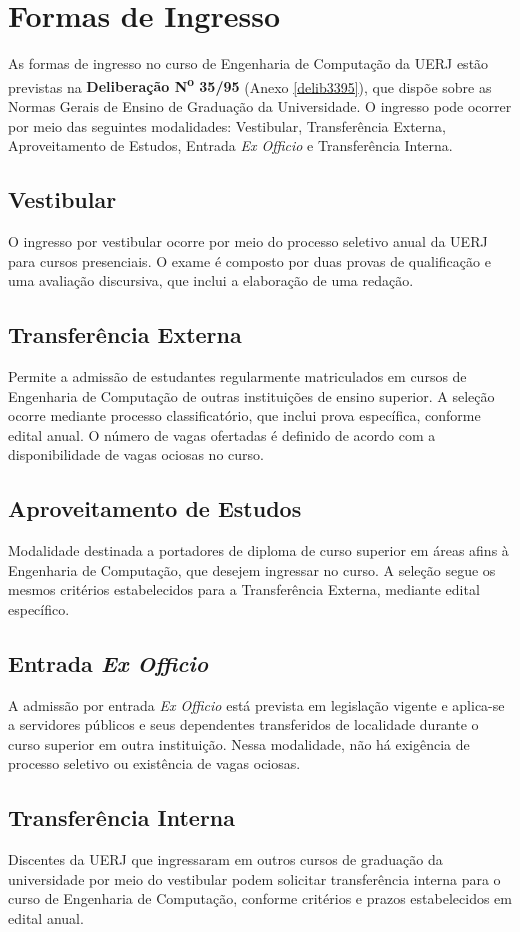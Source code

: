 \section{Formas de Ingresso}
\label{sec:forma-ingresso}

As formas de ingresso no curso de Engenharia de Computação da UERJ estão previstas na \textbf{Deliberação N\textsuperscript{o} 35/95} (Anexo \ref{delib3395}), que dispõe sobre as Normas Gerais de Ensino de Graduação da Universidade. O ingresso pode ocorrer por meio das seguintes modalidades: Vestibular, Transferência Externa, Aproveitamento de Estudos, Entrada \textit{Ex Officio} e Transferência Interna.

\subsection{Vestibular}
O ingresso por vestibular ocorre por meio do processo seletivo anual da UERJ para cursos presenciais. O exame é composto por duas provas de qualificação e uma avaliação discursiva, que inclui a elaboração de uma redação.

\subsection{Transferência Externa}
Permite a admissão de estudantes regularmente matriculados em cursos de Engenharia de Computação de outras instituições de ensino superior. A seleção ocorre mediante processo classificatório, que inclui prova específica, conforme edital anual. O número de vagas ofertadas é definido de acordo com a disponibilidade de vagas ociosas no curso.

\subsection{Aproveitamento de Estudos}
Modalidade destinada a portadores de diploma de curso superior em áreas afins à Engenharia de Computação, que desejem ingressar no curso. A seleção segue os mesmos critérios estabelecidos para a Transferência Externa, mediante edital específico.

\subsection{Entrada \textit{Ex Officio}}
A admissão por entrada \textit{Ex Officio} está prevista em legislação vigente e aplica-se a servidores públicos e seus dependentes transferidos de localidade durante o curso superior em outra instituição. Nessa modalidade, não há exigência de processo seletivo ou existência de vagas ociosas.

\subsection{Transferência Interna}
Discentes da UERJ que ingressaram em outros cursos de graduação da universidade por meio do vestibular podem solicitar transferência interna para o curso de Engenharia de Computação, conforme critérios e prazos estabelecidos em edital anual.





